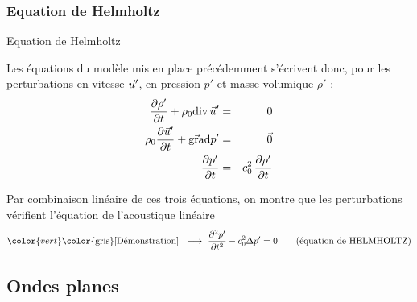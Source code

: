 \subsubsection{Equation de Helmholtz}
\begin{frame}{Equation de Helmholtz}

\small



\medskip

\pause
Les équations du modèle mis en place précédemment 
s'écrivent donc, pour les perturbations en vitesse $\vec{u}'$, 
en pression $p'$ et masse volumique $\rho'$ :
\begin{eqnarray}
	\displaystyle \frac{\partial \rho'}{\partial t} + \rho_0\mbox{\rm div}\, \vec{u}' & = & 0
	\\
	\rho_0 \displaystyle \frac{\partial \vec{u}'}{\partial t} + \vec{\mbox{\rm gra}}\mbox{\rm d} p' & = & \vec{0}
	\\
	\displaystyle \frac{\partial p'}{\partial t} & = & c_0^2 \, \displaystyle \frac{\partial \rho'}{\partial t} 
\end{eqnarray}

\medskip

\pause
Par combinaison linéaire de ces trois équations, on montre que les perturbations
vérifient l'équation de l'acoustique linéaire
\begin{equation}
	\color{vert}
	\mbox{\color{gris} [Démonstration] \; $\longrightarrow$ \;}
	\ddpdt{p'} - c_0^2 \Delta p' = 0 \qquad \mbox{(équation de HELMHOLTZ)}
\end{equation}

\vspace{0mm}

\end{frame}

\subsection{Ondes planes}

